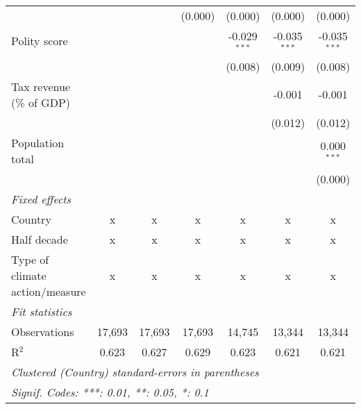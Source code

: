 \begin{tabular}{lcccccc}
                                                                               &              &               & (0.000)       & (0.000)        & (0.000)        & (0.000)\\   
   Polity score                                                                &              &               &               & -0.029$^{***}$ & -0.035$^{***}$ & -0.035$^{***}$\\   
                                                                               &              &               &               & (0.008)        & (0.009)        & (0.008)\\   
   Tax revenue (\% of GDP)                                                     &              &               &               &                & -0.001         & -0.001\\   
                                                                               &              &               &               &                & (0.012)        & (0.012)\\   
   Population total                                                            &              &               &               &                &                & 0.000$^{***}$\\   
                                                                               &              &               &               &                &                & (0.000)\\   
   \emph{Fixed effects}\\
   Country                                                                     & x            & x             & x             & x              & x              & x\\  
   Half decade                                                                 & x            & x             & x             & x              & x              & x\\  
   Type of climate action/measure                                              & x            & x             & x             & x              & x              & x\\  
   \midrule \emph{Fit statistics}\\
   Observations                                                                & 17,693       & 17,693        & 17,693        & 14,745         & 13,344         & 13,344\\  
   R$^2$                                                                       & 0.623        & 0.627         & 0.629         & 0.623          & 0.621          & 0.621\\  
   \midrule
   \multicolumn{7}{l}{\emph{Clustered (Country) standard-errors in parentheses}}\\
   \multicolumn{7}{l}{\emph{Signif. Codes: ***: 0.01, **: 0.05, *: 0.1}}\\
\end{tabular}
\par\endgroup


